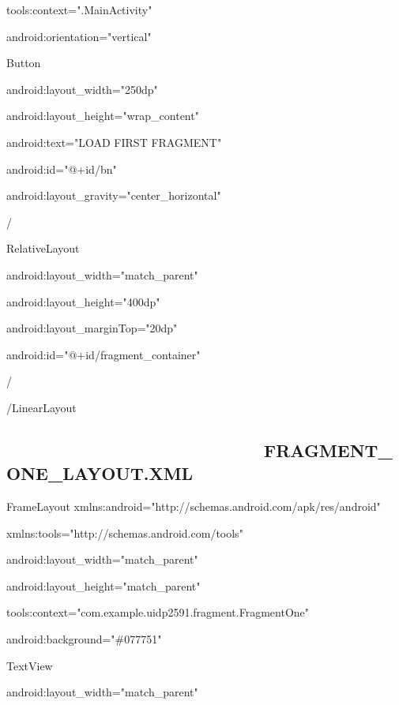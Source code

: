 \documentclass{article}
\begin{document}
tools:context=".MainActivity"

android:orientation="vertical"\TEXTsymbol{>}

\TEXTsymbol{<}Button

android:layout\_width="250dp"

android:layout\_height="wrap\_content"

android:text="LOAD FIRST FRAGMENT"

android:id="@+id/bn"

android:layout\_gravity="center\_horizontal"

/\TEXTsymbol{>}

\TEXTsymbol{<}RelativeLayout

android:layout\_width="match\_parent"

android:layout\_height="400dp"

android:layout\_marginTop="20dp"

android:id="@+id/fragment\_container"

/\TEXTsymbol{>}

\TEXTsymbol{<}/LinearLayout\TEXTsymbol{>}

\subsection{ \ \ \ \ \ \ \ \ \ \ \ \ \ \ \ \ \ \ \ \ \ \ \ \ \ \ \
FRAGMENT\_ONE\_LAYOUT.XML}


\bigskip 

\TEXTsymbol{<}FrameLayout
xmlns:android="http://schemas.android.com/apk/res/android"

xmlns:tools="http://schemas.android.com/tools"

android:layout\_width="match\_parent"

android:layout\_height="match\_parent"

tools:context="com.example.uidp2591.fragment.FragmentOne"

android:background="\#077751"\TEXTsymbol{>}

\TEXTsymbol{<}TextView

android:layout\_width="match\_parent"
\end{document}
